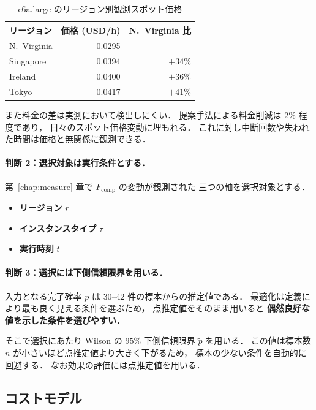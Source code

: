 \documentclass[11pt,a4paper]{ltjsreport}
\newcommand{\Fcomp}{F_{\mathrm{comp}}}
\begin{document}
\begin{table}[htbp]
\centering
\caption{c6a.large のリージョン別観測スポット価格}
\label{tab:price_gap}
\small
\begin{tabular}{@{}lrr@{}}
\toprule
リージョン & 価格 (USD/h) & N.~Virginia 比 \\
\midrule
N.~Virginia & 0.0295 & --- \\
Singapore   & 0.0394 & $+34\%$ \\
Ireland     & 0.0400 & $+36\%$ \\
Tokyo       & 0.0417 & $+41\%$ \\
\bottomrule
\end{tabular}
\end{table}

また料金の差は実測において検出しにくい．
提案手法による料金削減は $2\%$ 程度であり，
日々のスポット価格変動に埋もれる．
これに対し中断回数や失われた時間は価格と無関係に観測できる．

\paragraph{判断 2：選択対象は実行条件とする．}
第~\ref{chap:measure} 章で $\Fcomp$ の変動が観測された
三つの軸を選択対象とする．

\begin{itemize}
  \item \textbf{リージョン} $r$
  \item \textbf{インスタンスタイプ} $\tau$
  \item \textbf{実行時刻} $t$
\end{itemize}

\paragraph{判断 3：選択には下側信頼限界を用いる．}
入力となる完了確率 $p$ は $30$--$42$ 件の標本からの推定値である．
最適化は定義により最も良く見える条件を選ぶため，
点推定値をそのまま用いると
\textbf{偶然良好な値を示した条件を選びやすい}．

そこで選択にあたり Wilson の $95\%$ 下側信頼限界 $\tilde p$ を用いる．
この値は標本数 $n$ が小さいほど点推定値より大きく下がるため，
標本の少ない条件を自動的に回避する．
なお効果の評価には点推定値を用いる．

\subsection{コストモデル}
\label{sec:model_def}
\end{document}
